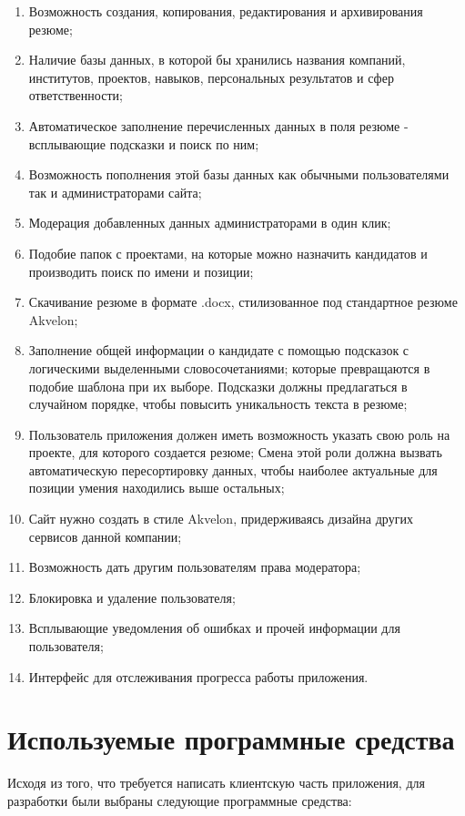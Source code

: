 \documentclass[a4paper,12pt]{diplom}
\begin{document}
\begin{enumerate}
\item Возможность создания, копирования, редактирования и архивирования резюме;
\item Наличие базы данных, в которой бы хранились названия компаний, институтов,
проектов, навыков, персональных результатов и сфер ответственности;
\item Автоматическое заполнение перечисленных данных в поля резюме - всплывающие подсказки и поиск по ним;
\item Возможность пополнения этой базы данных как обычными пользователями так и администраторами сайта;
\item Модерация добавленных данных администраторами в один клик;
\item Подобие папок с проектами, на которые можно назначить кандидатов и производить поиск по имени и позиции;
\item Скачивание резюме в формате .docx, стилизованное под стандартное резюме Akvelon;
\item Заполнение общей информации о кандидате с помощью подсказок с логическими выделенными словосочетаниями;
которые превращаются в подобие шаблона при их выборе. Подсказки должны предлагаться в случайном порядке, чтобы повысить уникальность текста в резюме;
\item Пользователь приложения должен иметь возможность указать свою роль на проекте, для которого создается резюме;
Смена этой роли должна вызвать автоматическую пересортировку данных,
чтобы наиболее актуальные для позиции умения находились выше остальных;
\item Сайт нужно создать в стиле Akvelon, придерживаясь дизайна других сервисов данной
компании;
\item Возможность дать другим пользователям права модератора;
\item Блокировка и удаление пользователя;
\item Всплывающие уведомления об ошибках и прочей информации для пользователя;
\item Интерфейс для отслеживания прогресса работы приложения.
\end{enumerate}

\section{Используемые программные средства}

Исходя из того, что требуется написать клиентскую часть приложения, для разработки были выбраны следующие программные средства:
\end{document}
